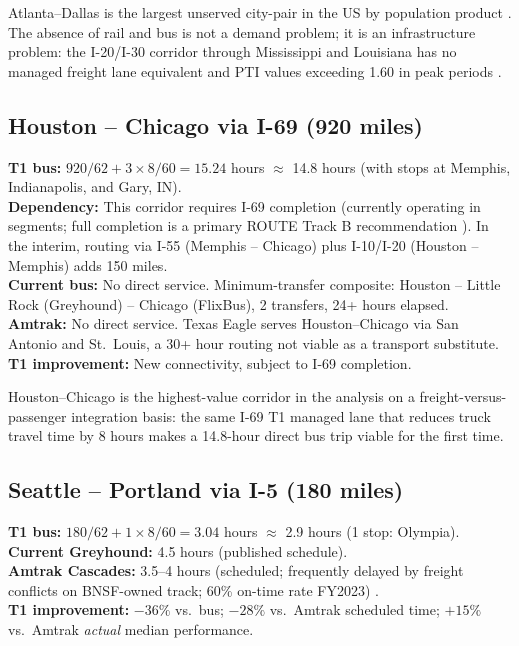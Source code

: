 Atlanta--Dallas is the largest unserved city-pair in the US by population product \citep{BTS_intermodal2023}. The absence of rail and bus is not a demand problem; it is an infrastructure problem: the I-20/I-30 corridor through Mississippi and Louisiana has no managed freight lane equivalent and PTI values exceeding 1.60 in peak periods \citep{FHWA_freight2023}.

\subsection{Houston -- Chicago via I-69 (920 miles)}

\textbf{T1 bus:} $920 / 62 + 3 \times 8/60 = 15.24$ hours $\approx$ 14.8 hours (with stops at Memphis, Indianapolis, and Gary, IN). \\
\textbf{Dependency:} This corridor requires I-69 completion (currently operating in segments; full completion is a primary ROUTE Track B recommendation \citep{ROUTE_B1}). In the interim, routing via I-55 (Memphis -- Chicago) plus I-10/I-20 (Houston -- Memphis) adds 150 miles. \\
\textbf{Current bus:} No direct service. Minimum-transfer composite: Houston -- Little Rock (Greyhound) -- Chicago (FlixBus), 2 transfers, 24+ hours elapsed. \\
\textbf{Amtrak:} No direct service. Texas Eagle serves Houston--Chicago via San Antonio and St.\ Louis, a 30+ hour routing not viable as a transport substitute. \\
\textbf{T1 improvement:} New connectivity, subject to I-69 completion.

Houston--Chicago is the highest-value corridor in the analysis on a freight-versus-passenger integration basis: the same I-69 T1 managed lane that reduces truck travel time by 8 hours \citep{ROUTE_C1} makes a 14.8-hour direct bus trip viable for the first time.

\subsection{Seattle -- Portland via I-5 (180 miles)}

\textbf{T1 bus:} $180 / 62 + 1 \times 8/60 = 3.04$ hours $\approx$ 2.9 hours (1 stop: Olympia). \\
\textbf{Current Greyhound:} 4.5 hours (published schedule). \\
\textbf{Amtrak Cascades:} 3.5--4 hours (scheduled; frequently delayed by freight conflicts on BNSF-owned track; 60\% on-time rate FY2023) \citep{Amtrak2023}. \\
\textbf{T1 improvement:} $-36\%$ vs.\ bus; $-28\%$ vs.\ Amtrak scheduled time; $+15\%$ vs.\ Amtrak \emph{actual} median performance.

